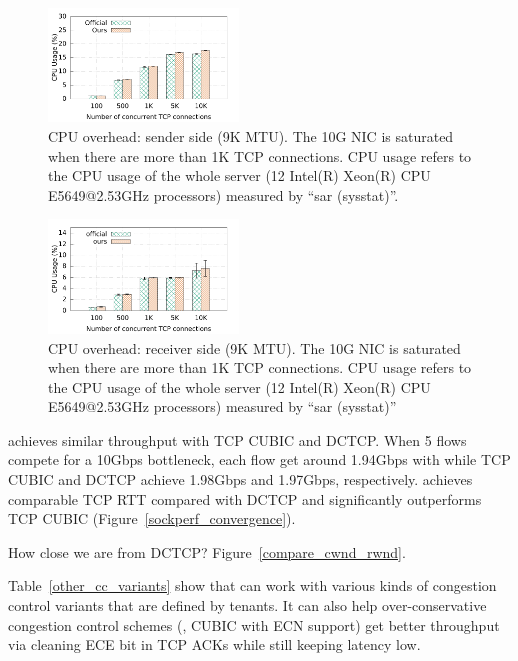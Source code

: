 \begin{figure}[!htb]
        \centering
  \includegraphics[width=0.45\textwidth]{figures/overhead/sender_9k_compare_cpu_witherrbar.pdf}
        \caption{CPU overhead: sender side (9K MTU). The 10G NIC is saturated when there are more than 1K TCP connections.
		CPU usage refers to the CPU usage of the whole server (12 Intel(R) Xeon(R) CPU E5649@2.53GHz processors)
                measured by ``sar (sysstat)''.}
        \label{cpu_overhead_sender_9k}
\end{figure}

\begin{figure}[!htb]
        \centering
  \includegraphics[width=0.45\textwidth]{figures/overhead/receiver_9k_compare_cpu_witherrbar.pdf}
        \caption{CPU overhead: receiver side (9K MTU). The 10G NIC is saturated when there are more than 1K TCP connections.
		CPU usage refers to the CPU usage of the whole server (12 Intel(R) Xeon(R) CPU E5649@2.53GHz processors)
                measured by ``sar (sysstat)''}
        \label{cpu_overhead_receiver_9k}
\end{figure}


\acdc{} achieves similar throughput with TCP CUBIC and DCTCP. When 5 flows compete
for a 10Gbps bottleneck, each flow get around 1.94Gbps with \acdc{} while TCP CUBIC
and DCTCP achieve 1.98Gbps and 1.97Gbps, respectively. \acdc{} achieves comparable TCP RTT compared
with DCTCP and significantly outperforms TCP CUBIC (Figure~\ref{sockperf_convergence}).

How close we are from DCTCP? Figure~\ref{compare_cwnd_rwnd}.

Table~\ref{other_cc_variants} show that \acdc{} can work with various kinds of congestion control variants that
are defined by tenants.
It can also help over-conservative congestion control schemes
(\eg{}, CUBIC with ECN support) get better throughput via cleaning ECE bit in TCP ACKs while
still keeping latency low.

